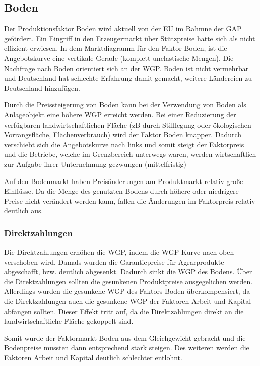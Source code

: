 \documentclass[11pt]{scrbook}
\begin{document}
\subsection{Boden}
Der Produktionsfaktor Boden wird aktuell von der \ac{EU} im Rahmne der \ac{GAP} gefördert.
Ein Eingriff in den Erzeugermarkt über Stützpreise hatte sich als nicht effizient erwiesen.
In dem Marktdiagramm für den Faktor Boden, ist die Angebotskurve eine vertikale Gerade (komplett unelastische Mengen).
Die Nachfrage nach Boden orientiert sich an der \ac{WGP}.
Boden ist nicht vermehrbar und Deutschland hat schlechte Erfahrung damit gemacht, weitere Ländereien zu Deutschland hinzufügen.

Durch die Preissteigerung von Boden kann bei der Verwendung von Boden als \glqq Anlageobjekt\grqq{} eine höhere \ac{WGP} erreicht werden.
Bei einer Reduzierung der verfügbaren landwirtschaftlichen Fläche (zB durch Stilllegung oder ökologischen Vorrangsfläche, \glqq Flächenverbrauch\grqq{}) wird der Faktor Boden knapper.
Dadurch verschiebt sich die Angebotskurve nach links und somit steigt der Faktorpreis und die Betriebe, welche im Grenzbereich unterwegs waren, werden wirtschaftlich zur Aufgabe ihrer Unternehmung gezwungen (mittelfristig)

Auf den Bodenmarkt haben Preisänderungen am Produktmarkt relativ große Einflüsse.
Da die Menge des genutzten Bodens durch höhere oder niedrigere Preise nicht verändert werden kann, fallen die Änderungen im Faktorpreis relativ deutlich aus.

\subsubsection{Direktzahlungen} 

Die Direktzahlungen erhöhen die \ac{WGP}, indem die \ac{WGP}-Kurve nach oben verschoben wird.
Damals wurden die Garantiepreise für Agrarprodukte abgeschafft, bzw. deutlich abgesenkt.
Dadurch sinkt die \ac{WGP} des Bodens.
Über die Direktzahlungen sollten die gesunkenen Produktpreise ausgegelichen werden.
Allerdings wurden die gesunkene \ac{WGP} des Faktors Boden überkompensiert, da die Direktzahlungen auch die gesunkene \ac{WGP} der Faktoren Arbeit und Kapital abfangen sollten.
Dieser Effekt tritt auf, da die Direktzahlungen direkt an die landwirtschaftliche Fläche gekoppelt sind.

Somit wurde der Faktormarkt Boden aus dem Gleichgewicht gebracht und die Bodenpreise mussten dann entsprechend stark steigen.
Des weiteren werden die Faktoren Arbeit und Kapital deutlich schlechter entlohnt.
\end{document}
